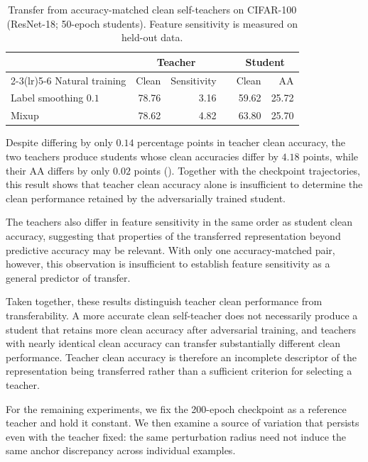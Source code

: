 \begin{table}[!htbp]
  \centering
  \small
  \setlength{\tabcolsep}{4.5pt}
  \caption{
  Transfer from accuracy-matched clean self-teachers on CIFAR-100
  (ResNet-18; 50-epoch students).
  Feature sensitivity is measured on held-out data.
  }
  \label{tab:matchedteacher}
  \begin{tabular}{lrrcrr}
    \toprule
    & \multicolumn{2}{c}{Teacher} && \multicolumn{2}{c}{Student} \\
    \cmidrule(lr){2-3}\cmidrule(lr){5-6}
    Natural training & Clean & Sensitivity && Clean & AA \\
    \midrule
    Label smoothing \(0.1\) & 78.76 & 3.16 && 59.62 & 25.72 \\
    Mixup                 & 78.62 & 4.82 && 63.80 & 25.70 \\
    \bottomrule
  \end{tabular}
\end{table}


Despite differing by only \(0.14\) percentage points in teacher clean
accuracy, the two teachers produce students whose clean accuracies differ by
\(4.18\) points, while their AA differs by only \(0.02\) points
().
Together with the checkpoint trajectories, this result shows that teacher
clean accuracy alone is insufficient to determine the clean performance
retained by the adversarially trained student.

The teachers also differ in feature sensitivity in the same order as student
clean accuracy, suggesting that properties of the transferred representation
beyond predictive accuracy may be relevant.
With only one accuracy-matched pair, however, this observation is insufficient
to establish feature sensitivity as a general predictor of transfer.

Taken together, these results distinguish teacher clean performance from
transferability.
A more accurate clean self-teacher does not necessarily produce a student
that retains more clean accuracy after adversarial training, and teachers
with nearly identical clean accuracy can transfer substantially different
clean performance.
Teacher clean accuracy is therefore an incomplete descriptor of the
representation being transferred rather than a sufficient criterion for
selecting a teacher.

For the remaining experiments, we fix the 200-epoch checkpoint as a reference
teacher and hold it constant.
We then examine a source of variation that persists even with the teacher
fixed: the same perturbation radius need not induce the same anchor discrepancy
across individual examples.